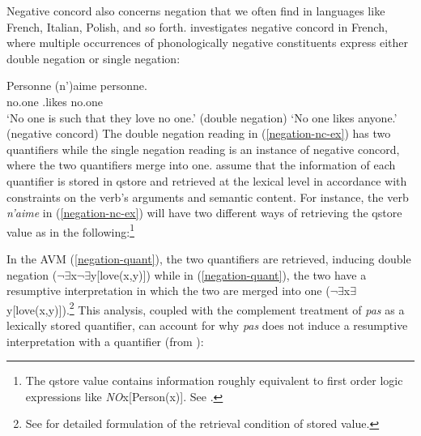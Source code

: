 \documentclass[output=paper
                ,modfonts
                ,nonflat
	        ,collection
	        ,collectionchapter
	        ,collectiontoclongg
 	        ,biblatex
                ,babelshorthands
                ,newtxmath
                ,draftmode
                ,colorlinks, citecolor=brown
]{./langsci/langscibook}
\begin{document}
{\begin{exe}
\begin{xlist}
Negative concord also concerns negation that
we often find in languages like French, Italian, Polish, and so forth.  \citet{Swart:02} investigates  negative concord in French, where multiple occurrences
of phonologically negative constituents express either
double negation or single negation:

\ea \label{negation-nc-ex}
\gll Personne (n')aime personne.\\
     no.one \NEG.likes no.one\\
\glt `No one is such that they love no one.' \hfill (double negation)
\glt `No one likes anyone.' \hfill  (negative concord)
\z
%
%
The double negation reading in (\ref{negation-nc-ex}) has two quantifiers while the single
negation reading is an instance of negative concord, where the two
quantifiers merge into one. \citet{Swart:02} assume that the information of
each quantifier is stored in {\sc qstore} and retrieved at the
lexical level in accordance with constraints on the verb's arguments and semantic
content. For instance, the verb \textit{n'aime} in (\ref{negation-nc-ex}) will have two different ways of retrieving the
{\sc qstore} value as in the following:\footnote{The
{\sc qstore} value contains information
roughly equivalent to first order logic expressions like \textit{NO}x[Person(x)]. See \citet{Swart:02}.}

\eal
\ex
{}
\ex
{}
\label{negation-quant}
\zl
%
%
\noindent
In the AVM (\ref{negation-quant}), the two quantifiers are retrieved, inducing double negation ($\neg\exists$x$\neg\exists$y[love(x,y)]) while in (\ref{negation-quant}), the two have a resumptive interpretation in which the two are merged into one ($\neg\exists$x$\exists$y[love(x,y)]).\footnote{See \citet{Swart:02} for detailed formulation of the retrieval condition of stored value.} This analysis, coupled with the complement treatment of \textit{pas} as a lexically stored quantifier, can account
for why {\it pas} does not induce a resumptive interpretation with a quantifier (from \citealt{Swart:02}):



\end{xlist}
\end{exe}}
\end{document}
